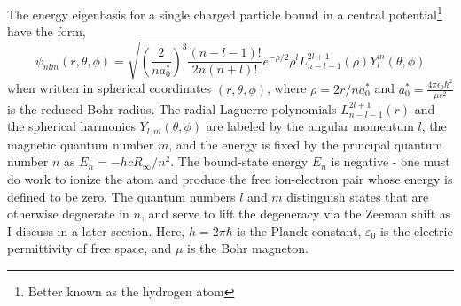 	
	
	The energy eigenbasis for a single charged particle bound in a central potential\footnote{Better known as the hydrogen atom} have the form,
	\begin{equation}
	\psi_{nlm}(r,\theta,\phi) = 
	\sqrt{\left(\frac{2}{na_0 ^*}\right)^3\frac{(n-l-1)!}{2n(n+l)!}}e^{-\rho/2}\rho^l L_{n-l-1}^{2l+1}(\rho) Y^{m}_{l}(\theta,\phi)
	\end{equation}
	when written in spherical coordinates $(r,\theta,\phi)$, where $\rho = 2r/na_0 ^*$ and $a_0 ^* = \frac{4\pi\epsilon_0 \hbar^2}{\mu e^2}$ is the reduced Bohr radius.
	The radial Laguerre polynomials $L_{n-l-1}^{2l+1}(r)$ and the spherical harmonics $Y_{l,m}(\theta,\phi)$ are labeled by the angular momentum $l$, the magnetic quantum number $m$, and the energy is fixed by the principal quantum number $n$ as $E_n = -hcR_\infty/n^2$.
	The bound-state energy $E_n$ is negative - one must do work to ionize the atom and produce the free ion-electron pair whose energy is defined to be zero.
	The quantum numbers $l$ and $m$ distinguish states that are otherwise degnerate in $n$, and serve to lift the degeneracy via the Zeeman shift as I discuss in a later section.
	Here,  $h=2\pi\hbar$ is the Planck constant, $\varepsilon_0$ is the electric permittivity of free space, and $\mu$ is the Bohr magneton.
	
	

